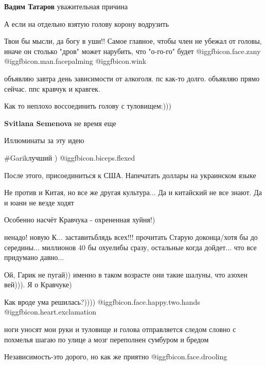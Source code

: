 \begin{itemize}
\begin{itemize}
\textbf{Вадим Татаров} уважительная причина
\end{itemize} %

А если на отдельно взятую голову корону водрузить


Твои бы мысли, да богу в уши!! Самое главное, чтобы член не убежал от головы,
иначе он столько "дров" может нарубить, что "о-го-го" будет
@igg{fbicon.face.zany}  @igg{fbicon.man.facepalming}  @igg{fbicon.wink} 


объявляю завтра день зависимости от алкоголя. пс как-то долго. объявляю прямо
сейчас. ппс кравчук и кравгек.


Как то неплохо воссоединить голову с туловищем:)))

\textbf{Svitlana Semenova} не время еще

Иллюминаты за эту идею

\#Garikлучший ) @igg{fbicon.biceps.flexed} 

После этого, присоединиться к США. Напечатать доллары на украинском языке

Не против и Китая, но все же другая культура... Да и китайский не все знают. Да и юани не везде ходят

Особенно насчёт Кравчука - охрененная хуйня!)


ненадо! новую К... заставитьблядь всех!!! прочитать Старую доконца/хотя бы до
середины... миллионов 40 бы охуелибы сразу, остальные когда дойдет... что все
придумано давно...


Ой, Гарик не пугай)) именно в таком возрасте они такие шалуны, что азохен вей))). Я о Кравчуке)

Как вроде ума решилась?))))  @igg{fbicon.face.happy.two.hands} @igg{fbicon.heart.exclamation}


\obeycr
ноги уносят мои руки и туловище
и голова отправляется следом
словно с похмелья шагаю по улице
а мозг переполнен сумбуром и бредом
\restorecr


Независимость-это дорого, но как же приятно @igg{fbicon.face.drooling} 


\end{itemize}
